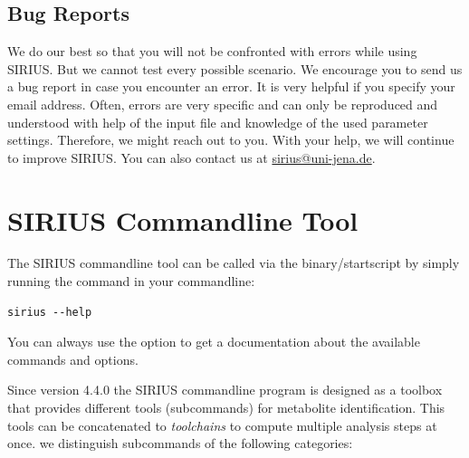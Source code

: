 \documentclass[letterpaper,10pt,openany,oneside]{sphinxmanual}
\begin{document}

\section{Bug Reports}

We do our best so that you will not be confronted with errors while using
SIRIUS.  But we cannot test every possible scenario.  We encourage you to
send us a bug report in case you encounter an error.  It is very helpful if
you specify your email address. Often, errors are very specific and can only
be reproduced and understood with help of the input file and knowledge of the
used parameter settings. Therefore, we might reach out to you. With your help, we will continue to improve SIRIUS.  You
can also contact us at \url{sirius@uni-jena.de}.




\chapter{SIRIUS Commandline Tool}
\label{commandline::doc}\label{commandline:sirius-commandline-tool}

The SIRIUS commandline tool can be called via the binary/startscript by simply running the command  in your commandline:

\begin{Verbatim}[commandchars=\\\{\}]
sirius --help
\end{Verbatim}

You can always use the  option to get a documentation about the available commands and options.

Since version 4.4.0 the SIRIUS commandline program is designed as a toolbox that 
provides different tools (subcommands) for metabolite identification. This tools can be concatenated to \emph{toolchains} to compute multiple analysis steps at once. we distinguish subcommands of the following categories:
\end{document}

